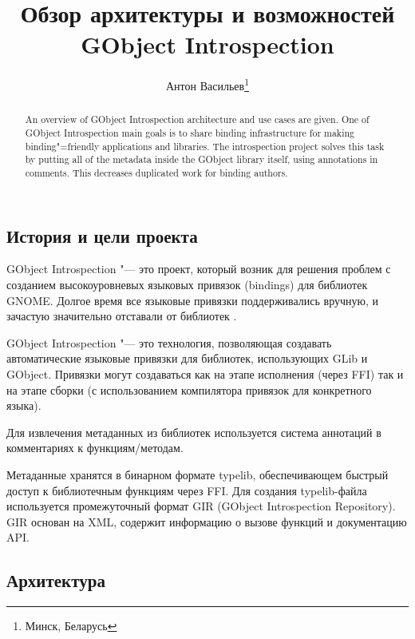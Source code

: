 \documentclass[10pt, a5paper]{article}
\begin{document}
\title{Обзор архитектуры и возможностей GObject Introspection}%

\author{Антон Васильев\footnote{Минск, Беларусь}}
\maketitle

\begin{abstract}
An overview of GObject Introspection architecture and use cases are given.
One of GObject Introspection main goals is to share binding infrastructure for making binding"=friendly applications and libraries.
The introspection project solves this task by putting all of the metadata
inside the GObject library itself, using annotations in comments.
This decreases duplicated work for binding authors.
\end{abstract}

\subsection*{История и цели проекта}

GObject Introspection "--- это проект, который возник для решения проблем
с созданием высокоуровневых языковых привязок (bindings) для библиотек GNOME. Долгое время все языковые привязки поддерживались вручную, и зачастую значительно отставали от библиотек \cite{Antono1}.

GObject Introspection "--- это технология, позволяющая создавать
автоматические языковые привязки для библиотек, использующих GLib и
GObject.  Привязки могут создаваться как на этапе исполнения (через
FFI) так и на этапе сборки (с использованием компилятора привязок для
конкретного языка).

Для извлечения метаданных из библиотек используется система аннотаций в комментариях к функциям/методам.

Метаданные хранятся в бинарном формате typelib, обеспечивающем
быстрый доступ к библиотечным функциям через FFI. Для создания typelib-файла используется промежуточный формат GIR (GObject Introspection
Repository). GIR основан на XML, содержит информацию о вызове
функций и документацию API.

\subsection*{Архитектура}
\end{document}
